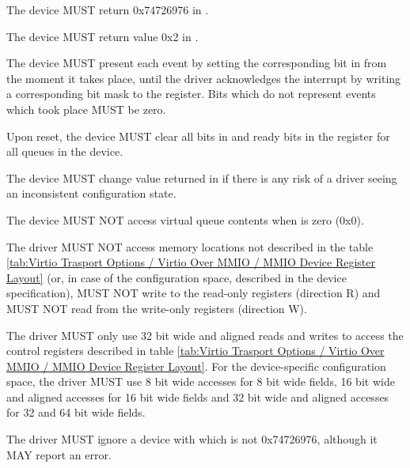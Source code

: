 
The device MUST return 0x74726976 in .

The device MUST return value 0x2 in .

The device MUST present each event by setting the corresponding bit in  from the
moment it takes place, until the driver acknowledges the interrupt
by writing a corresponding bit mask to the  register.  Bits which
do not represent events which took place MUST be zero.

Upon reset, the device MUST clear all bits in  and ready bits in the
 register for all queues in the device.

The device MUST change value returned in  if there is any risk of a
driver seeing an inconsistent configuration state.

The device MUST NOT access virtual queue contents when  is zero (0x0).

The driver MUST NOT access memory locations not described in the
table \ref{tab:Virtio Trasport Options / Virtio Over MMIO / MMIO Device Register Layout}
(or, in case of the configuration space, described in the device specification),
MUST NOT write to the read-only registers (direction R) and
MUST NOT read from the write-only registers (direction W).

The driver MUST only use 32 bit wide and aligned reads and writes to access the control registers
described in table \ref{tab:Virtio Trasport Options / Virtio Over MMIO / MMIO Device Register Layout}.
For the device-specific configuration space, the driver MUST use 8 bit wide accesses for
8 bit wide fields, 16 bit wide and aligned accesses for 16 bit wide fields and 32 bit wide and
aligned accesses for 32 and 64 bit wide fields.

The driver MUST ignore a device with  which is not 0x74726976,
although it MAY report an error.

